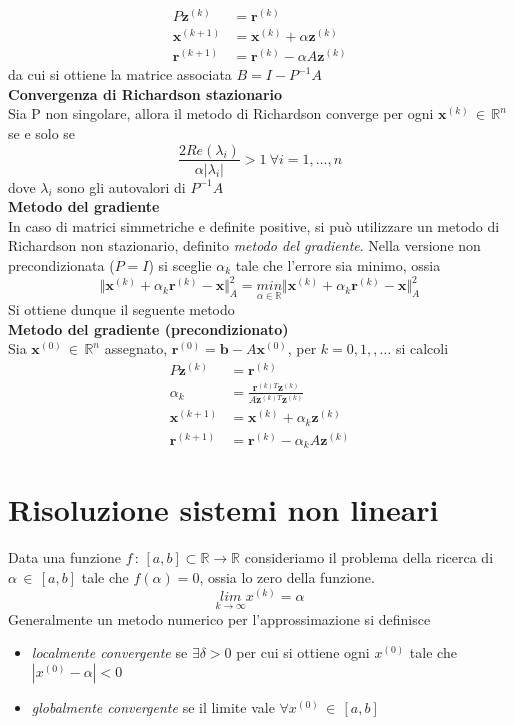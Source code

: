 \documentclass[a4paper,12pt]{article}
\begin{document}
\begin{align*}
P\textbf{z}^{(k)}  & = \textbf{r}^{(k)} \\
\textbf{x}^{(k+1)} & = \textbf{x}^{(k)} + \alpha\textbf{z}^{(k)} \\
\textbf{r}^{(k + 1)} & = \textbf{r}^{(k)} - \alpha A \textbf{z}^{(k)}
\end{align*}
da cui si ottiene la matrice associata $B = I - P^{-1}A$ \\
\textbf{Convergenza di Richardson stazionario} \\
Sia P non singolare, allora il metodo di Richardson converge per ogni $\textbf{x}^{(k)} \, \in \, \mathbb{R}^{n}$ se e solo se 
$$ \frac{2Re(\lambda_{i})}{\alpha|\lambda_{i}|} > 1 \ \forall i = 1, \ldots , n$$
dove $\lambda_{i}$ sono gli autovalori di $P^{-1}A$ \\
\textbf{Metodo del gradiente} \\
In caso di matrici simmetriche e definite positive, si può utilizzare un metodo di Richardson non stazionario, definito \textit{metodo del gradiente}. Nella versione non precondizionata ($P = I$) si sceglie $\alpha_k$ tale che l'errore sia minimo, ossia
$$
\Vert \textbf{x}^{(k)} + \alpha_k \textbf{r}^{(k)} - \textbf{x} \Vert_{A}^{2} = \underset{\alpha \in \mathbb{R}}{min} \Vert \textbf{x}^{(k)} + \alpha_k \textbf{r}^{(k)} - \textbf{x} \Vert_{A}^{2}
$$
Si ottiene dunque il seguente metodo \\
\textbf{Metodo del gradiente (precondizionato)} \\
Sia $\textbf{x}^{(0)} \, \in \, \mathbb{R}^{n}$ assegnato, $\textbf{r}^{(0)} = \textbf{b} - A\textbf{x}^{(0)}$, per $k = 0, 1, ,\ldots $ si calcoli
\begin{align*}
P\textbf{z}^{(k)}  & = \textbf{r}^{(k)} \\
\alpha_k & = \frac{\textbf{r}^{(k)T} \textbf{z}^{(k)}}{A\textbf{z}^{(k)T} \textbf{z}^{(k)}} \\
\textbf{x}^{(k+1)} & = \textbf{x}^{(k)} + \alpha_k \textbf{z}^{(k)} \\
\textbf{r}^{(k + 1)} & = \textbf{r}^{(k)} - \alpha_k A \textbf{z}^{(k)}
\end{align*}
\section{Risoluzione sistemi non lineari}
Data una funzione $f \, : \, [a, b] \subset \mathbb{R} \rightarrow \mathbb{R} $ consideriamo il problema della ricerca di $\alpha \, \in \, [a, b]$ tale che $ f(\alpha) = 0$, ossia lo zero della funzione. \\
$$\underset{k \rightarrow \infty}{lim} x^{(k)} = \alpha$$
Generalmente un metodo numerico per l'approssimazione si definisce
\begin{itemize}
\item \textit{localmente convergente} se $\exists \delta > 0$ per cui si ottiene ogni $x^{(0)}$ tale che $|x^{(0)} - \alpha| < 0$
\item \textit{globalmente convergente} se il limite vale $\forall x^{(0)} \, \in \, [a, b]$
\end{itemize}
\end{document}
